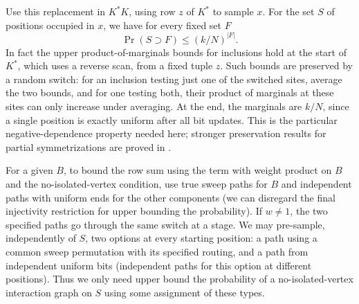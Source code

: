 Use this replacement in \(K^* K\), using row \(z\) of \(K^*\) to sample \(x\). For the set \(S\) of positions occupied in \(x\), we have for every fixed set \(F\)
\begin{equation}
 \Pr(S\supset F)\le (k/N)^{|F|}.                                                            \label{ten:weighted:eq:2}
\end{equation}
In fact the upper product-of-marginals bounds for inclusions hold at the start of \(K^*\), which uses a reverse scan, from a fixed tuple \(z\). Such bounds are preserved by a random switch: for an inclusion testing just one of the switched sites, average the two bounds, and for one testing both, their product of marginals at these sites can only increase under averaging. At the end, the marginals are \(k/N\), since a single position is exactly uniform after all bit updates. This is the particular negative-dependence property needed here; stronger preservation results for partial symmetrizations are proved in \cite[Theorems~4.9 and~4.20]{BorceaBrandenLiggett2009}.

For a given \(B\), to bound the row sum using the term with weight product on \(B\) and the no-isolated-vertex condition, use true sweep paths for \(B\) and independent paths with uniform ends for the other components (we can disregard the final injectivity restriction for upper bounding the probability). If \(w\ne 1\), the two specified paths go through the same switch at a stage. We may pre-sample, independently of \(S\), two options at every starting position: a path using a common sweep permutation with its specified routing, and a path from independent uniform bits (independent paths for this option at different positions). Thus we only need upper bound the probability of a no-isolated-vertex interaction graph on \(S\) using some assignment of these types.

